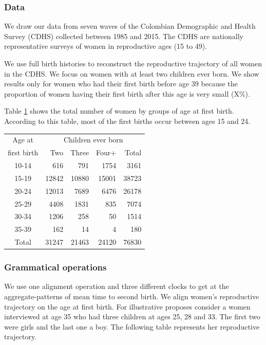 \documentclass{article}
\begin{document}
\subsubsection{Data}

We draw our data from seven waves of the Colombian Demographic and Health Survey (CDHS) collected between 1985 and 2015. The CDHS are nationally representative surveys of women in reproductive ages (15 to 49).

We use full birth histories to reconstruct the reproductive trajectory of all women in the CDHS. We focus on women with at least two children ever born. We show results only for women who had their first birth before age 39 because the proportion of women having their first birth after this age is very small (X\%).

Table \ref{tfert_01} shows the total number of women by groups of age at first birth. According to this table, most of the first births occur between ages 15 and 24.

\begin{table}[ht]
\centering
\begin{tabular}{crrrr}
  \hline
Age at  & \multicolumn{4}{c}{Children ever born} \\ 
first birth & Two & Three & Four+ & Total \\ 
  \hline
10-14 & 616 & 791 & 1754 & 3161 \\ 
  15-19 & 12842 & 10880 & 15001 & 38723 \\ 
  20-24 & 12013 & 7689 & 6476 & 26178 \\ 
  25-29 & 4408 & 1831 & 835 & 7074 \\ 
  30-34 & 1206 & 258 & 50 & 1514 \\ 
  35-39 & 162 & 14 & 4 & 180 \\\hline 
  Total & 31247 & 21463 & 24120 & 76830 \\ 
   \hline
\end{tabular}
\label{tfert_01}
\end{table}

\subsubsection{Grammatical operations}

We use one alignment operation and three different clocks to get at the aggregate-patterns of mean time to second birth. We align women's reproductive trajectory on the age at first birth. For illustrative proposes consider a women interviewed at age 35 who had three children at ages 25, 28 and 33. The first two were girls and the last one a boy. The following table represents her reproductive trajectory.
\end{document}
